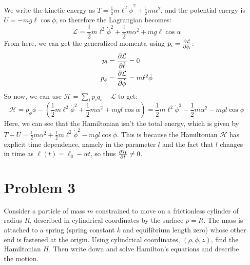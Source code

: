 \documentclass[10pt]{article}
\begin{document}
	\begin{solution}
		We write the kinetic energy as $T = \frac{1}{2}m \ell^2 \dot \phi^2 + \frac{1}{2} m \alpha^2$, and the 
		potential energy is $U = -mg\ell\cos\phi$, so therefore the Lagrangian becomes: 
		\[
		\mathcal L = \frac{1}{2}m\ell^2 \dot \phi^2 + \frac{1}{2}m \alpha^2 + mg \ell \cos \alpha
		\] 
		From here, we can get the generalized momenta using $p_i = \pdv{\mathcal L}{\dot q_i}$:
		\begin{align*}
			p_l &= \pdv{\mathcal L}{\dot \ell} = 0 \\
			p_\phi &= \pdv{\mathcal L}{\dot \phi} = m\ell^2 \dot \phi
		\end{align*}
		So now, we can use $\mathcal H = \sum_i p_i q_i - \mathcal L$ to get: 
		\[
		\mathcal H = p_\phi \dot \phi - \left( \frac{1}{2} m\ell^2 \dot \phi^2 + \frac{1}{2}m \alpha^2 + 
		mgl \cos \alpha\right) = \frac{1}{2}m\ell^2 \dot \phi^2 - \frac{1}{2}m \alpha^2 - mgl \cos \phi
		\] 
		Here, we can see that the Hamiltonian isn't the total energy, which is given by $T + U = \frac{1}{2}m
		\alpha^2 + \frac{1}{2}m \ell^2 \dot \phi^2 - mgl \cos \phi$. This is because the Hamiltonian $\mathcal H$ has explicit time dependence, namely in the parameter $l$
		and the fact that $l$ changes in time as $\ell(t) = \ell_0 - \alpha t$, so thus $\pdv{\mathcal H}{t} \neq
		0$.  
	\end{solution}


	\pagebreak

	\section*{Problem 3}
	Consider a particle of mass $m$ constrained to move on a frictionless cylinder of radius $R$, described in 
	cylindrical coordinates by the surface $\rho = R$. The mass is attached to a spring (spring constant $k$
	and equilibrium length zero) whose other end is fastened at the origin. Using cylindrical coordinates, 
	$(\rho, \phi, z)$, find the Hamiltonian $H$. Then write down and solve Hamilton's equations and describe
	the motion.
\end{document}
